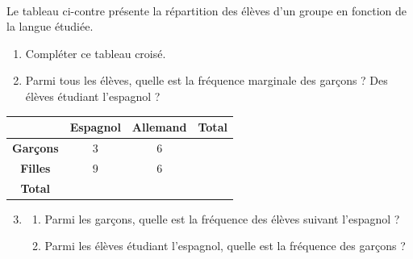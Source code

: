 \documentclass[11pt]{article}
\begin{document}
\begin{exo}~\\
\begin{minipage}{.4\textwidth}
  Le tableau ci-contre présente la répartition des élèves d'un groupe en
  fonction de la langue étudiée.
  \begin{enumerate}
    \item Compléter ce tableau croisé.
    \item Parmi tous les élèves, quelle est la fréquence marginale des garçons ?
      Des élèves étudiant l'espagnol ?
  \end{enumerate}
\end{minipage}
\begin{minipage}{.6\textwidth}
\begin{center}
\renewcommand{\arraystretch}{2}
\begin{tabular}{|c|c|c|c|}
  \cline{2-4}
  \multicolumn{1}{c|}{} & \textbf{Espagnol} & \textbf{Allemand} &
  \textbf{Total} \\
  \hline
  \textbf{Garçons} & $3$ & $6$ & \\
  \hline
  \textbf{Filles} & $9$ & $6$ & \\
  \hline
  \textbf{Total} & & & \\
  \hline
\end{tabular}
\end{center}
\end{minipage}
\begin{enumerate}
    \setcounter{enumi}{2}
    \item \begin{enumerate}
        \item Parmi les garçons, quelle est la fréquence des élèves suivant
          l'espagnol ?
        \item Parmi les élèves étudiant l'espagnol, quelle est la fréquence des
          garçons ?
    \end{enumerate}
\end{enumerate}
\end{exo}
\end{document}
